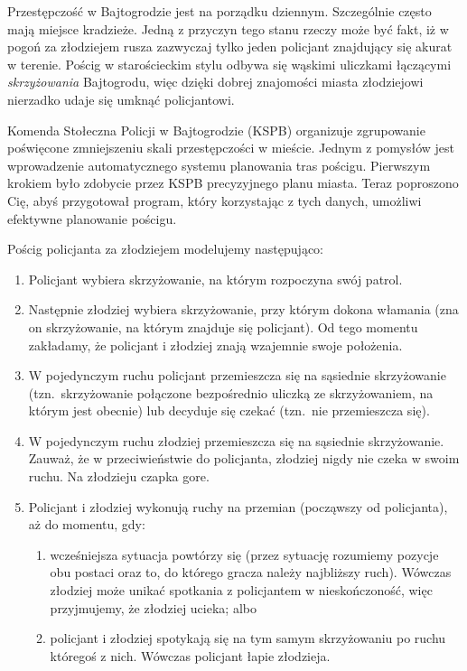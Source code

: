 \documentclass{boi2014-pl}
\begin{document}
    Przestępczość w Bajtogrodzie jest na porządku dziennym.
    Szczególnie często mają miejsce kradzieże.
    Jedną z przyczyn tego stanu rzeczy może być fakt, iż w pogoń za złodziejem
    rusza zazwyczaj tylko jeden policjant znajdujący się akurat w terenie.
    Pościg w starościeckim stylu odbywa się wąskimi uliczkami łączącymi
    \emph{skrzyżowania} Bajtogrodu, więc dzięki dobrej znajomości miasta złodziejowi
    nierzadko udaje się umknąć policjantowi.

    Komenda Stołeczna Policji w Bajtogrodzie (KSPB) organizuje zgrupowanie poświęcone
    zmniejszeniu skali przestępczości w mieście.
    Jednym z pomysłów jest wprowadzenie automatycznego systemu planowania tras pościgu.
    Pierwszym krokiem było zdobycie przez KSPB precyzyjnego planu miasta.
    Teraz poproszono Cię, abyś przygotował program, który korzystając z tych danych,
    umożliwi efektywne planowanie pościgu.

    Pościg policjanta za złodziejem modelujemy następująco:
    \begin{enumerate}
        \item Policjant wybiera skrzyżowanie, na którym rozpoczyna swój patrol.
        \item Następnie złodziej wybiera skrzyżowanie, przy którym dokona włamania
            (zna on skrzyżowanie, na którym znajduje się policjant).
            Od tego momentu zakładamy, że policjant i złodziej znają wzajemnie
            swoje położenia.
        \item W pojedynczym ruchu policjant przemieszcza się na sąsiednie skrzyżowanie
            (tzn.\ skrzyżowanie połączone bezpośrednio uliczką ze skrzyżowaniem,
            na którym jest obecnie) lub decyduje się czekać (tzn.\ nie przemieszcza się).
        \item W pojedynczym ruchu złodziej przemieszcza się na sąsiednie skrzyżowanie.
            Zauważ, że w przeciwieństwie do policjanta, złodziej nigdy nie czeka
            w swoim ruchu.
            Na złodzieju czapka gore.
        \item Policjant i złodziej wykonują ruchy na przemian (począwszy od policjanta),
            aż do momentu, gdy:
        \begin{enumerate}
            \item wcześniejsza sytuacja powtórzy się (przez sytuację rozumiemy pozycje
                obu postaci oraz to, do którego gracza należy najbliższy ruch).
                Wówczas złodziej może unikać spotkania z policjantem w nieskończoność,
                więc przyjmujemy, że złodziej ucieka; albo
            \item policjant i złodziej spotykają się na tym samym skrzyżowaniu
                po ruchu któregoś z nich.
                Wówczas policjant łapie złodzieja.
        \end{enumerate}
    \end{enumerate}
\end{document}
